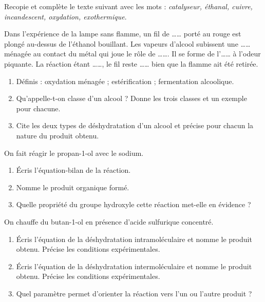 \documentclass[11pt]{article}
\newcommand{\cle}[1]{{\popxbold\color{popdark}#1}}
\newcounter{popsec}
\newcounter{popsub}
\newcommand{\courssub}[1]{%
  \stepcounter{popsub}%
  \par\vspace{9pt}\noindent{\popxbold\fontsize{11.5}{13}\selectfont\color{popink}{\color{poporange}\thepopsec.\thepopsub}\hspace{6pt}#1}\par\nopagebreak\vspace{4pt}
}
\begin{document}
\begin{exercice}
Recopie et complète le texte suivant avec les mots : \emph{catalyseur, éthanal, cuivre, incandescent, oxydation, exothermique}.

Dans l'expérience de la lampe sans flamme, un fil de \dots\ldots{} porté au rouge est plongé au-dessus de l'éthanol bouillant. Les vapeurs d'alcool subissent une \dots\ldots{} ménagée au contact du métal qui joue le rôle de \dots\ldots{}. Il se forme de l'\dots\ldots{} à l'odeur piquante. La réaction étant \dots\ldots{}, le fil reste \dots\ldots{} bien que la flamme ait été retirée.
\end{exercice}

\begin{exercice}
\begin{enumerate}
  \item Définis : oxydation ménagée ; estérification ; fermentation alcoolique.
  \item Qu'appelle-t-on \cle{classe} d'un alcool ? Donne les trois classes et un exemple pour chacune.
  \item Cite les deux types de déshydratation d'un alcool et précise pour chacun la nature du produit obtenu.
\end{enumerate}
\end{exercice}

\courssub{Je m'entraîne}

\begin{exercice}
On fait réagir le propan-1-ol avec le sodium.
\begin{enumerate}
  \item Écris l'équation-bilan de la réaction.
  \item Nomme le produit organique formé.
  \item Quelle propriété du groupe hydroxyle cette réaction met-elle en évidence ?
\end{enumerate}
\end{exercice}

\begin{exercice}
On chauffe du butan-1-ol en présence d'acide sulfurique concentré.
\begin{enumerate}
  \item Écris l'équation de la déshydratation intramoléculaire et nomme le produit obtenu. Précise les conditions expérimentales.
  \item Écris l'équation de la déshydratation intermoléculaire et nomme le produit obtenu. Précise les conditions expérimentales.
  \item Quel paramètre permet d'orienter la réaction vers l'un ou l'autre produit ?
\end{enumerate}
\end{exercice}
\end{document}

